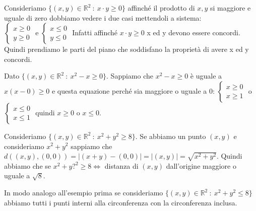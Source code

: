 \begin{example}\label{ess-4}
Consideriamo $\{(x,y) \in \mathbb{R}^2 \::\: x \cdot y \geq 0\}$ affinché il prodotto di $x, y$ si maggiore e uguale di zero dobbiamo vedere i due casi mettendoli a sistema:\\
$\begin{cases}x \geq 0 \\ y \geq 0\end{cases}$ e $\begin{cases}x \leq 0 \\ y \leq 0\end{cases}$
Infatti affinché $x \cdot y \geq 0$ x ed y devono essere concordi. Quindi prendiamo le parti del piano che soddisfano la proprietà di avere x ed y concordi.
\end{example}

\begin{example}\label{ess-5}
Dato $\{(x,y) \in \mathbb{R}^2 \::\: x^2 - x \geq 0\}$. Sappiamo che $x^2 - x \geq 0$ è uguale a $x(x-0) \geq 0$ e questa equazione perché sia maggiore o uguale a 0:
$\begin{cases}x \geq 0 \\ x \geq 1\end{cases}$ o $\begin{cases}x \leq 0 \\ x \leq 1\end{cases}$ quindi $x \geq 0$ o $x \leq 0$.
\end{example}

\begin{example}\label{ess-6}
Consideriamo $\{(x,y) \in \mathbb{R}^2 \::\: x^2 + y^2 \geq 8\}$. Se abbiamo un punto $(x,y)$ e consideriamo $x^2 + y^2$ sappiamo che $d((x,y), (0,0)) = |(x+y) - (0,0)| = |(x,y)| = \sqrt{x^2 + y^2}$. Quindi abbiamo che se $x^2 + y?^2 \geq 8 \Longleftrightarrow$ distanza di $(x,y)$ dall'origine maggiore o uguale a $\sqrt{8}$.
\end{example}

\begin{example}\label{ess-7}
In modo analogo all'esempio prima se consideriamo $\{(x,y) \in \mathbb{R}^2 \::\: x^2+y^2 \leq 8\}$ abbiamo tutti i punti interni alla circonferenza con la circonferenza inclusa.
\end{example}

